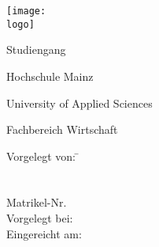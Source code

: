 \begin{titlepage}

\begin{minipage}{\textwidth}
		\noindent \hfill \texttt{[image: \\logo]}
\end{minipage}
\vspace{6em}

\begin{center}
    {\huge \art}
    
    {\Large Studiengang \studiengang}
    
    \vspace{4em}
    
    \textbf{{\Large \titel}}
    
    \vspace{4em}
    
    Hochschule Mainz
    
    University of Applied Sciences

    Fachbereich Wirtschaft
    
    \vspace{6em}

	\begin{minipage}{\textwidth}
		\begin{tabbing}
		
		Vorgelegt von:  \hspace*{2em}\= \autor \\
		\> \strasseAutor \\
        \> \stadtAutor \\
        \> Matrikel-Nr. \matrikelnr \\
        Vorgelegt bei: \> \betreuer \\
        Eingereicht am: \> \datumAbgabe
		\end{tabbing}

	\end{minipage}
\end{center}
\end{titlepage}
